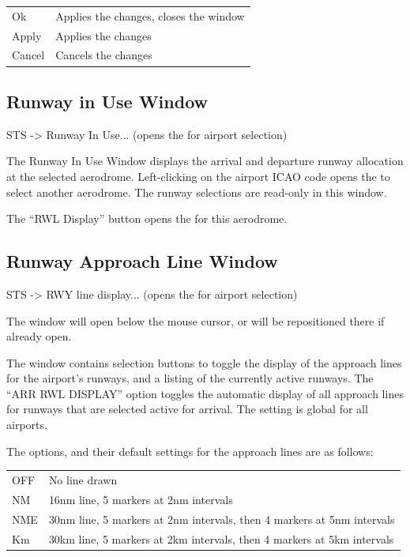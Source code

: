 \documentclass[a4paper,oneside,11pt]{memoir}
\begin{document}
\begin{longtable}{p{2.5cm} p{10cm}}
  Ok      & Applies the changes, closes the window\\
  Apply   & Applies the changes\\
  Cancel  & Cancels the changes\\
\end{longtable}

\subsection{Runway in Use Window}\label{win:riuw}

 STS -> Runway In Use... (opens the  for airport selection) 


The Runway In Use Window displays the arrival and departure runway allocation at the selected aerodrome. Left-clicking on the airport ICAO code opens the  to select another aerodrome. The runway selections are read-only in this window.

\bigskip

The “RWL Display” button opens the  for this aerodrome.

\subsection{Runway Approach Line Window}\label{win:ralw}

 STS -> RWY line display... (opens the  for airport selection)


The window will open below the mouse cursor, or will be repositioned there if already open. 

\bigskip

The window contains selection buttons to toggle the display of the approach lines for the airport’s runways, and a listing of the currently active runways. The “ARR RWL DISPLAY” option toggles the automatic display of all approach lines for runways that are selected active for arrival. The setting is global for all airports.

\bigskip

The options, and their default settings for the approach lines are as follows:

\begin{longtable}{p{2.5cm} p{10cm}}
  OFF & No line drawn\\
  NM  & 16nm line, 5 markers at 2nm intervals\\
  NME & 30nm line, 5 markers at 2nm intervals, then 4 markers at 5nm intervals\\
  Km  & 30km line, 5 markers at 2km intervals, then 4 markers at 5km intervals\\
\end{longtable}
\end{document}
